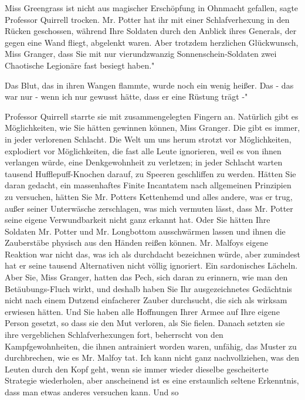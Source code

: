 \glqq{}Miss Greengrass ist nicht aus magischer Erschöpfung in Ohnmacht
gefallen\grqq{}, sagte Professor Quirrell trocken. \glqq{}Mr. Potter hat ihr mit
einer Schlafverhexung in den Rücken geschossen, während Ihre Soldaten durch den
Anblick ihres Generals, der gegen eine Wand fliegt, abgelenkt waren. Aber
trotzdem herzlichen Glückwunsch, Miss Granger, dass Sie mit nur vierundzwanzig
Sonnenschein-Soldaten zwei Chaotische Legionäre fast besiegt haben."

Das Blut, das in ihren Wangen flammte, wurde noch ein wenig heißer. \glqq{}Das -
das war nur - wenn ich nur gewusst hätte, dass er eine Rüstung trägt -"

Professor Quirrell starrte sie mit zusammengelegten Fingern an. \glqq{}Natürlich
gibt es Möglichkeiten, wie Sie hätten gewinnen können, Miss Granger. Die gibt es
immer, in jeder verlorenen Schlacht. Die Welt um uns herum strotzt vor
Möglichkeiten, explodiert vor Möglichkeiten, die fast alle Leute ignorieren,
weil es von ihnen verlangen würde, eine Denkgewohnheit zu verletzen; in jeder
Schlacht warten tausend Hufflepuff-Knochen darauf, zu Speeren geschliffen zu
werden. Hätten Sie daran gedacht, ein massenhaftes Finite Incantatem nach
allgemeinen Prinzipien zu versuchen, hätten Sie Mr. Potters Kettenhemd und alles
andere, was er trug, außer seiner Unterwäsche zerschlagen, was mich vermuten
lässt, dass Mr. Potter seine eigene Verwundbarkeit nicht ganz erkannt hat. Oder
Sie hätten Ihre Soldaten Mr. Potter und Mr. Longbottom ausschwärmen lassen und
ihnen die Zauberstäbe physisch aus den Händen reißen können. Mr. Malfoys eigene
Reaktion war nicht das, was ich als durchdacht bezeichnen würde, aber zumindest
hat er seine tausend Alternativen nicht völlig ignoriert.\grqq{} Ein
sardonisches Lächeln. \glqq{}Aber Sie, Miss Granger, hatten das Pech, sich daran
zu erinnern, wie man den Betäubungs-Fluch wirkt, und deshalb haben Sie Ihr
ausgezeichnetes Gedächtnis nicht nach einem Dutzend einfacherer Zauber
durchsucht, die sich als wirksam erwiesen hätten. Und Sie haben alle Hoffnungen
Ihrer Armee auf Ihre eigene Person gesetzt, so dass sie den Mut verloren, als
Sie fielen. Danach setzten sie ihre vergeblichen Schlafverhexungen fort,
beherrscht von den Kampfgewohnheiten, die ihnen antrainiert worden waren,
unfähig, das Muster zu durchbrechen, wie es Mr. Malfoy tat. Ich kann nicht ganz
nachvollziehen, was den Leuten durch den Kopf geht, wenn sie immer wieder
dieselbe gescheiterte Strategie wiederholen, aber anscheinend ist es eine
erstaunlich seltene Erkenntnis, dass man etwas anderes versuchen kann. Und so
